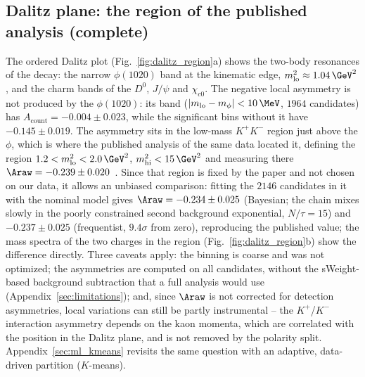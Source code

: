 \subsection{Dalitz plane: the region of the published analysis (complete)}
The ordered Dalitz plot (Fig.~\ref{fig:dalitz_region}a) shows the two-body resonances of the decay: the narrow $\phi(1020)$ band at the kinematic edge, $m^2_{\mathrm{lo}}\approx1.04\,\GeV^2$, and the charm bands of the $D^0$, $J/\psi$ and $\chi_{c0}$. The negative local asymmetry is not produced by the $\phi(1020)$: its band ($|m_{\mathrm{lo}}-m_\phi|<10\,\MeV$, $1964$ candidates) has $A_{\mathrm{count}}=-0.004\pm0.023$, while the significant bins without it have $-0.145\pm0.019$. The asymmetry sits in the low-mass $K^+K^-$ region just above the $\phi$, which is where the published analysis of the same data located it, defining the region $1.2<m^2_{\mathrm{lo}}<2.0\,\GeV^2$, $m^2_{\mathrm{hi}}<15\,\GeV^2$ and measuring there $\Araw=-0.239\pm0.020$~\cite{lhcb_cpv_2013}. Since that region is fixed by the paper and not chosen on our data, it allows an unbiased comparison: fitting the $2146$ candidates in it with the nominal model gives $\Araw=-0.234\pm0.025$ (Bayesian; the chain mixes slowly in the poorly constrained second background exponential, $N/\tau=15$) and $-0.237\pm0.025$ (frequentist, $9.4\sigma$ from zero), reproducing the published value; the mass spectra of the two charges in the region (Fig.~\ref{fig:dalitz_region}b) show the difference directly. Three caveats apply: the binning is coarse and was not optimized; the asymmetries are computed on all candidates, without the sWeight-based background subtraction that a full analysis would use (Appendix~\ref{sec:limitations}); and, since $\Araw$ is not corrected for detection asymmetries, local variations can still be partly instrumental -- the $K^+$/$K^-$ interaction asymmetry depends on the kaon momenta, which are correlated with the position in the Dalitz plane, and is not removed by the polarity split. Appendix~\ref{sec:ml_kmeans} revisits the same question with an adaptive, data-driven partition ($K$-means).

